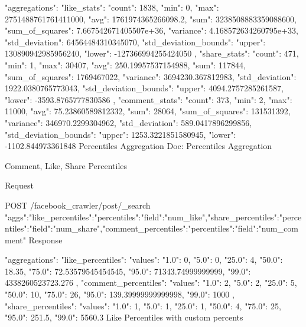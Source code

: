 {
   "aggregations": {
      "like_stats": {
         "count": 1838,
         "min": 0,
         "max": 2751488761761411000,
         "avg": 1761974365266098.2,
         "sum": 3238508883359088600,
         "sum_of_squares": 7.667542671405507e+36,
         "variance": 4.168572634260795e+33,
         "std_deviation": 64564484310345070,
         "std_deviation_bounds": {
            "upper": 130890942985956240,
            "lower": -127366994255424050
         }
      },
      "share_stats": {
         "count": 471,
         "min": 1,
         "max": 30407,
         "avg": 250.19957537154988,
         "sum": 117844,
         "sum_of_squares": 1769467022,
         "variance": 3694230.367812983,
         "std_deviation": 1922.0380765773043,
         "std_deviation_bounds": {
            "upper": 4094.2757285261587,
            "lower": -3593.8765777830586
         }
      },
      "comment_stats": {
         "count": 373,
         "min": 2,
         "max": 11000,
         "avg": 75.23860589812332,
         "sum": 28064,
         "sum_of_squares": 131531392,
         "variance": 346970.2299304962,
         "std_deviation": 589.0417896299856,
         "std_deviation_bounds": {
            "upper": 1253.3221851580945,
            "lower": -1102.844973361848
         }
      }
   }
}
Percentiles Aggregation
Doc: Percentiles Aggregation

Comment, Like, Share Percentiles

Request

POST /facebook_crawler/post/_search
{"aggs":{"like_percentiles":{"percentiles":{"field":"num_like"}},"share_percentiles":{"percentiles":{"field":"num_share"}},"comment_percentiles":{"percentiles":{"field":"num_comment"}}}}
Response

{
"aggregations": {
      "like_percentiles": {
         "values": {
            "1.0": 0,
            "5.0": 0,
            "25.0": 4,
            "50.0": 18.35,
            "75.0": 72.53579545454545,
            "95.0": 71343.74999999999,
            "99.0": 4338260523723.276
         }
      },
      "comment_percentiles": {
         "values": {
            "1.0": 2,
            "5.0": 2,
            "25.0": 5,
            "50.0": 10,
            "75.0": 26,
            "95.0": 139.39999999999998,
            "99.0": 1000
         }
      },
      "share_percentiles": {
         "values": {
            "1.0": 1,
            "5.0": 1,
            "25.0": 1,
            "50.0": 4,
            "75.0": 25,
            "95.0": 251.5,
            "99.0": 5560.3
         }
      }
   }
}
Like Percentiles with custom percents

